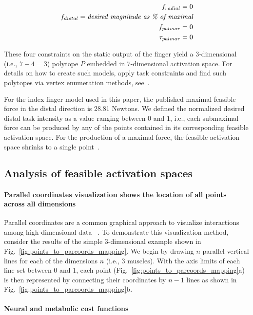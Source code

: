\documentclass[9pt,twocolumn,twoside,lineno]{pnas-new}
\begin{document}
{\begin{eqnarray}
f_{radial} = 0 \\
f_{distal} = \emph{desired magnitude as \% of maximal} \\
f_{palmar} = 0 \\
\tau_{palmar} = 0
\end{eqnarray}

These four constraints on the static output of the finger yield a 3-dimensional (i.e., $7-4=3$) polytope $P$ embedded in 7-dimensional activation space.
For details on how to create such models, apply task constraints and find such polytopes via vertex enumeration methods, see~\cite{valero-cuevas2015fundamentals}.

For the index finger model used in this paper, the published maximal feasible force in the distal direction is 28.81 Newtons. We defined the normalized desired distal task intensity as a value ranging between $0$ and $1$, i.e., each submaximal force can be produced by any of the points contained in its corresponding feasible activation space. For the production of a maximal force, the feasible activation space shrinks to a single point~\cite{spoor1983balancing,Chao1978Graphical,chvatal1983linear,Valero-Cuevas2000Scaling}.

\subsection*{Analysis of feasible activation spaces}
\paragraph*{Parallel coordinates visualization shows the location of all points across all dimensions}

Parallel coordinates are a common graphical approach to visualize interactions among high-dimensional data ~\cite{bachynskyi2013biomechanical, krekel2010visual}.
To demonstrate this visualization method, consider the results of the simple 3-dimensional example shown in Fig.~\ref{fig:points_to_parcoords_mapping}. We begin by drawing $n$ parallel vertical lines for each of the dimensions $n$ (i.e., 3 muscles).
With the axis limits of each line set between 0 and 1, each point (Fig.~\ref{fig:points_to_parcoords_mapping}a) is then represented by connecting their coordinates by $n-1$ lines as shown in Fig.~\ref{fig:points_to_parcoords_mapping}b.

\paragraph*{Neural and metabolic cost functions}

}
\end{document}
